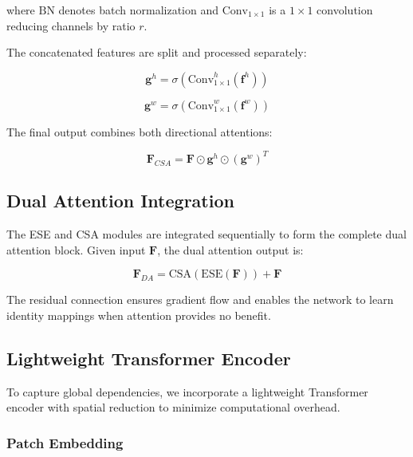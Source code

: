 \documentclass[default, iicol]{sn-jnl}
\theoremstyle{thmstyleone}%
\theoremstyle{thmstyletwo}%
\theoremstyle{thmstylethree}%
\begin{document}
where $\text{BN}$ denotes batch normalization and $\text{Conv}_{1\times1}$ is a $1 \times 1$ convolution reducing channels by ratio $r$.

The concatenated features are split and processed separately:

\begin{equation}
\mathbf{g}^h = \sigma\left(\text{Conv}_{1\times1}^h(\mathbf{f}^h)\right)
\label{eq:gh}
\end{equation}

\begin{equation}
\mathbf{g}^w = \sigma\left(\text{Conv}_{1\times1}^w(\mathbf{f}^w)\right)
\label{eq:gw}
\end{equation}

The final output combines both directional attentions:

\begin{equation}
\mathbf{F}_{CSA} = \mathbf{F} \odot \mathbf{g}^h \odot (\mathbf{g}^w)^T
\label{eq:csa_output}
\end{equation}

\subsection{Dual Attention Integration}

The ESE and CSA modules are integrated sequentially to form the complete dual attention block. Given input $\mathbf{F}$, the dual attention output is:

\begin{equation}
\mathbf{F}_{DA} = \text{CSA}\left(\text{ESE}(\mathbf{F})\right) + \mathbf{F}
\label{eq:dual_attention}
\end{equation}

The residual connection ensures gradient flow and enables the network to learn identity mappings when attention provides no benefit.

\subsection{Lightweight Transformer Encoder}

To capture global dependencies, we incorporate a lightweight Transformer encoder with spatial reduction to minimize computational overhead.

\subsubsection{Patch Embedding}
\end{document}
